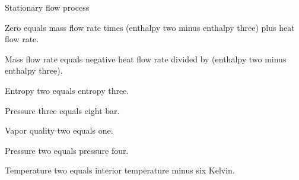 Stationary flow process  

Zero equals mass flow rate times (enthalpy two minus enthalpy three) plus heat flow rate.  

Mass flow rate equals negative heat flow rate divided by (enthalpy two minus enthalpy three).  

Entropy two equals entropy three.  

Pressure three equals eight bar.  

Vapor quality two equals one.  

Pressure two equals pressure four.  

Temperature two equals interior temperature minus six Kelvin.